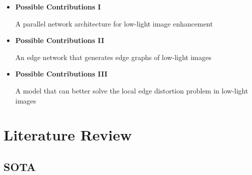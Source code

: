 \documentclass[CJK,aspectratio=169]{beamer}  %
\begin{document}
	\begin{frame}
		
		\begin{itemize} 
			\item \textbf{Possible Contributions I}
			
			A parallel network architecture for low-light image enhancement
			
			\item \textbf{Possible Contributions II}
			
			An edge network that generates edge graphs of low-light images
			
			\item \textbf{Possible Contributions III}
			
			A model that can better solve the local edge distortion problem in low-light images
		\end{itemize}

	\end{frame}
	
	
	\section{Literature Review}
	
	\subsection{SOTA}
	
\end{document}
